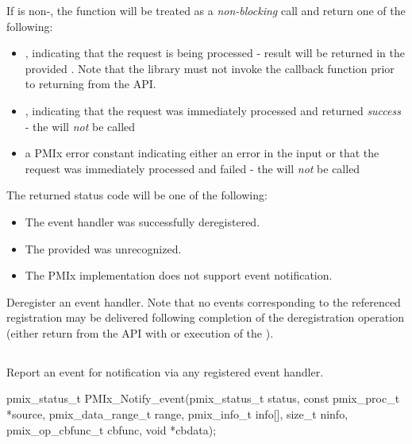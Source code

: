 If  is non-, the function will be treated as a \emph{non-blocking} call and return one of the following:

\begin{itemize}
\item {}, indicating that the request is being processed - result will be returned in the provided . Note that the library must not invoke the callback function prior to returning from the \ac{API}.
\item {}, indicating that the request was immediately processed and returned \textit{success} - the  will \textit{not} be called
\item a PMIx error constant indicating either an error in the input or that the request was immediately processed and failed - the  will \textit{not} be called
\end{itemize}

The returned status code will be one of the following:

\begin{itemize}
\item {} The event handler was successfully deregistered.
\item {} The provided  was unrecognized.
\item {} The \ac{PMIx} implementation does not support event notification.
\end{itemize}

\descr

Deregister an event handler. Note that no events corresponding to the referenced registration may be delivered following completion of the deregistration operation (either return from the \ac{API} with  or execution of the ).

\subsection{}

\summary

Report an event for notification via any
registered event handler.

\format

\cspecificstart
\begin{codepar}
pmix_status_t
PMIx_Notify_event(pmix_status_t status,
                  const pmix_proc_t *source,
                  pmix_data_range_t range,
                  pmix_info_t info[], size_t ninfo,
                  pmix_op_cbfunc_t cbfunc, void *cbdata);
\end{codepar}
\cspecificend

